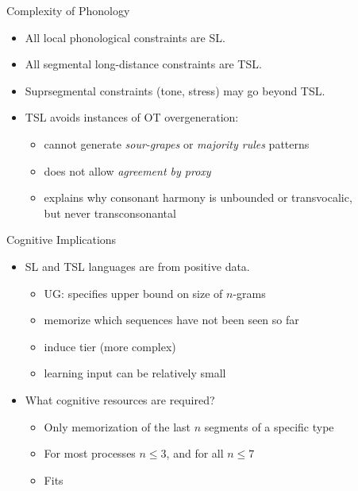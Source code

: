 \documentclass[xcolor={usenames,svgnames,x11names,table}]{beamer}
\begin{document}
\begin{frame}{Complexity of Phonology}
    \begin{itemize}
        \item All local phonological constraints are SL\@.
        \item All segmental long-distance constraints are TSL\@.\\
        \item Suprsegmental constraints (tone, stress) may go beyond TSL\@.\\
        \item TSL avoids instances of OT overgeneration:
            \begin{itemize}
                \item cannot generate \emph{sour-grapes} or \emph{majority rules} patterns
                \item does not allow \emph{agreement by proxy}
                \item explains why consonant harmony is unbounded or transvocalic,\\
                    but never transconsonantal\\
            \end{itemize}
    \end{itemize}
\end{frame}

\begin{frame}{Cognitive Implications}
    \begin{itemize}
        \item SL and TSL languages are  from positive data.\\
            \begin{itemize}
                \item UG: specifies upper bound on size of $n$-grams
                \item memorize which sequences have not been seen so far
                \item induce tier (more complex)
                \item learning input can be relatively small
            \end{itemize}
        \item What cognitive resources are required?\\
            \begin{itemize}
                \item Only memorization of the last $n$ segments of a specific type
                \item For most processes $n \leq 3$, and for all $n \leq 7$
                \item Fits 
            \end{itemize}

    \end{itemize}
\end{frame}
\end{document}
